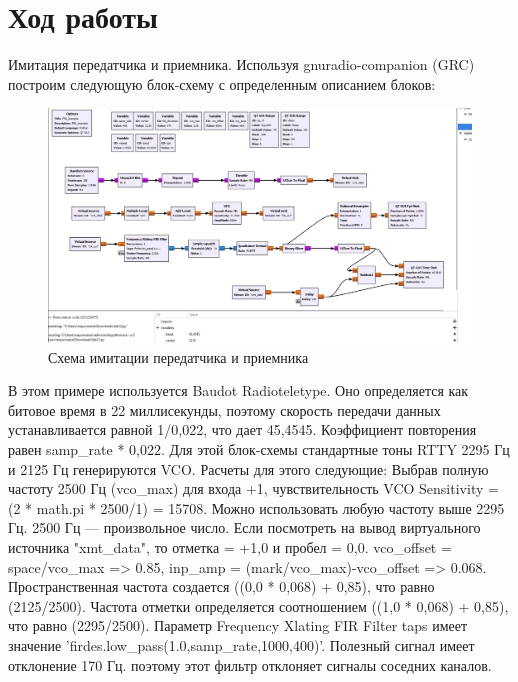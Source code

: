 \documentclass{article}
\begin{document}
\newpage
\section{Ход работы}
Имитация передатчика и приемника. Используя gnuradio-companion (GRC) построим следующую блок-схему с определенным описанием блоков:
\begin{figure}[ht]
    \centering
    \includegraphics[width=1\linewidth]{1.png}
    \caption{Схема имитации передатчика и приемника}
    \label{fig:enter-label1}
\end{figure}

В этом примере используется Baudot Radioteletype. Оно определяется как битовое время в 22 миллисекунды, поэтому скорость передачи данных устанавливается равной 1/0,022, что дает 45,4545. 
Коэффициент повторения равен samp\_rate * 0,022.
Для этой блок-схемы стандартные тоны RTTY 2295 Гц и 2125 Гц генерируются VCO. Расчеты для этого следующие: 
Выбрав полную частоту 2500 Гц (vco\_max) для входа +1, чувствительность VCO Sensitivity = (2 * math.pi * 2500/1) = 15708. Можно использовать любую частоту выше 2295 Гц. 2500 Гц — произвольное число. 
Если посмотреть на вывод виртуального источника "xmt\_data", то отметка = +1,0 и пробел = 0,0.
vco\_offset = space/vco\_max => 0.85, inp\_amp = (mark/vco\_max)-vco\_offset => 0.068. 
Пространственная частота создается ((0,0 * 0,068) + 0,85), что равно (2125/2500). 
Частота отметки определяется соотношением ((1,0 * 0,068) + 0,85), что равно (2295/2500). 
Параметр Frequency Xlating FIR Filter taps имеет значение 'firdes.low\_pass(1.0,samp\_rate,1000,400)'. Полезный сигнал имеет отклонение 170 Гц. поэтому этот фильтр отклоняет сигналы соседних каналов. 
\newpage
\end{document}
